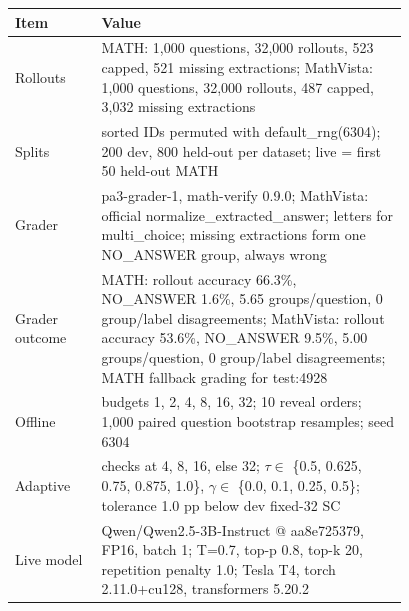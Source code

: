 \begin{tabular}{lp{0.78\linewidth}}
\toprule
Item & Value \\
\midrule
Rollouts & MATH: 1,000 questions, 32,000 rollouts, 523 capped, 521 missing extractions; MathVista: 1,000 questions, 32,000 rollouts, 487 capped, 3,032 missing extractions \\
Splits & sorted IDs permuted with default\_rng(6304); 200 dev, 800 held-out per dataset; live = first 50 held-out MATH \\
Grader & pa3-grader-1, math-verify 0.9.0; MathVista: official normalize\_extracted\_answer; letters for multi\_choice; missing extractions form one NO\_ANSWER group, always wrong \\
Grader outcome & MATH: rollout accuracy 66.3\%, NO\_ANSWER 1.6\%, 5.65 groups/question, 0 group/label disagreements; MathVista: rollout accuracy 53.6\%, NO\_ANSWER 9.5\%, 5.00 groups/question, 0 group/label disagreements; MATH fallback grading for test:4928 \\
Offline & budgets 1, 2, 4, 8, 16, 32; 10 reveal orders; 1,000 paired question bootstrap resamples; seed 6304 \\
Adaptive & checks at 4, 8, 16, else 32; $\tau \in$ \{0.5, 0.625, 0.75, 0.875, 1.0\}, $\gamma \in$ \{0.0, 0.1, 0.25, 0.5\}; tolerance 1.0 pp below dev fixed-32 SC \\
Live model & Qwen/Qwen2.5-3B-Instruct @ aa8e725379, FP16, batch 1; T=0.7, top-p 0.8, top-k 20, repetition penalty 1.0; Tesla T4, torch 2.11.0+cu128, transformers 5.20.2 \\
\bottomrule
\end{tabular}